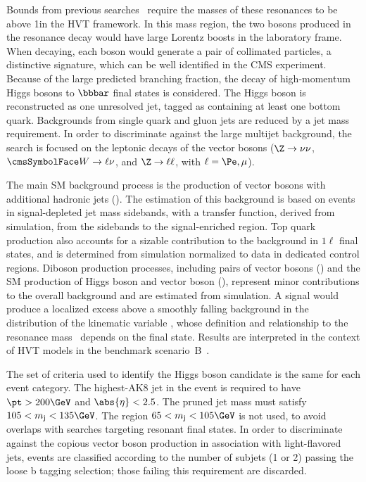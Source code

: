 Bounds from previous searches~\cite{Khachatryan:2015lba,Khachatryan:2015bma,Khachatryan:2015ywa,Khachatryan:2016yji} require the masses of 
these resonances to be above 1\TeV in the HVT framework. In this mass region, the two bosons produced in the resonance decay would have 
large Lorentz boosts in the laboratory frame. When decaying, each boson would generate a pair of collimated particles, a distinctive 
signature, which can be well identified in the CMS experiment.
Because of the large predicted branching fraction, the decay of high-momentum Higgs bosons to $\bbbar$ final states is considered. The 
Higgs boson is reconstructed as one unresolved jet, tagged as containing at least one bottom quark. Backgrounds from single quark and gluon 
jets are reduced by a jet mass requirement. In order to discriminate against the large multijet background, the search is focused on the 
leptonic decays of the vector bosons ($\Z \to \nu\nu$, $\PW \to \ell \nu$, and $\Z \to \ell \ell$, with $\ell = \Pe,\mu$).

The main SM background process is the production of vector bosons with additional hadronic jets (\Vjets). The estimation of this background 
is based on events in signal-depleted jet mass sidebands, with a transfer function, derived from simulation, from the sidebands to the 
signal-enriched region. Top quark production also accounts for a sizable contribution to the background in $1\ell$ final states, and is 
determined from simulation normalized to data in dedicated control regions. Diboson production processes, including pairs of vector bosons 
(\VV) and the SM production of \a Higgs boson and vector boson (\VH), represent minor contributions to the overall background and are 
estimated from simulation. A signal would produce a localized excess above a smoothly falling background in the distribution of the 
kinematic variable \mVH, whose definition and relationship to the resonance mass \mX\ depends on the final state. Results are interpreted in 
the context of HVT models in the benchmark scenario~B~\cite{Pappadopulo2014}.

The set of criteria used to identify the Higgs boson candidate is the same for each event category. The highest-\pt AK8 jet in the event is 
required to have $\pt>200\GeV$ and $\abs{\eta}<2.5$. The pruned jet mass \mj must satisfy $105 < \mj < 135\GeV$. The region 
$65 < \mj < 105\GeV$ is not used, to avoid overlaps with searches targeting resonant \VV final states. In order to discriminate against the 
copious vector boson production in association with light-flavored jets, events are classified according to the number of subjets (1 or 2) 
passing the loose b tagging selection; those failing this requirement are discarded.


